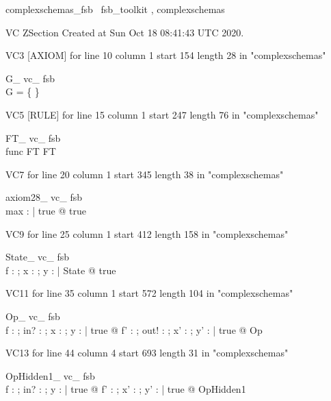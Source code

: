 \documentclass{article}
\begin{document}

\begin{zsection}	 \SECTION complexschemas\_fsb \parents~fsb\_toolkit , complexschemas
\end{zsection}

VC ZSection Created at Sun Oct 18 08:41:43 UTC 2020.

VC3 [AXIOM] for line 10 column 1 start 154 length 28 in "complexschemas"
\begin{theorem}{ G\_ vc\_ fsb}\\
 \lnot G = \{ \} \\

\end{theorem}

VC5 [RULE] for line 15 column 1 start 247 length 76 in "complexschemas"
\begin{theorem}{ FT\_ vc\_ fsb}\\
 func \in \nat \cross FT \inj FT \\

\end{theorem}

VC7 for line 20 column 1 start 345 length 38 in "complexschemas"
\begin{theorem}{ axiom28\_ vc\_ fsb}\\
 \exists max : \nat | true @ true \\

\end{theorem}

VC9 for line 25 column 1 start 412 length 158 in "complexschemas"
\begin{theorem}{ State\_ vc\_ fsb}\\
 \exists f : \nat \pfun \nat ; x : \nat ; y : \power \nat | State @ true \\

\end{theorem}

VC11 for line 35 column 1 start 572 length 104 in "complexschemas"
\begin{theorem}{ Op\_ vc\_ fsb}\\
 \forall f : \nat \pfun \nat ; in? : \nat ; x : \nat ; y : \power \nat | true @ \exists f' : \nat \pfun \nat ; out! : \nat ; x' : \nat ; y' : \power \nat | true @ Op \\

\end{theorem}

VC13 for line 44 column 4 start 693 length 31 in "complexschemas"
\begin{theorem}{ OpHidden1\_ vc\_ fsb}\\
 \forall f : \nat \pfun \nat ; in? : \nat ; y : \power \nat | true @ \exists f' : \nat \pfun \nat ; x' : \nat ; y' : \power \nat | true @ OpHidden1 \\

\end{theorem}
\end{document}
